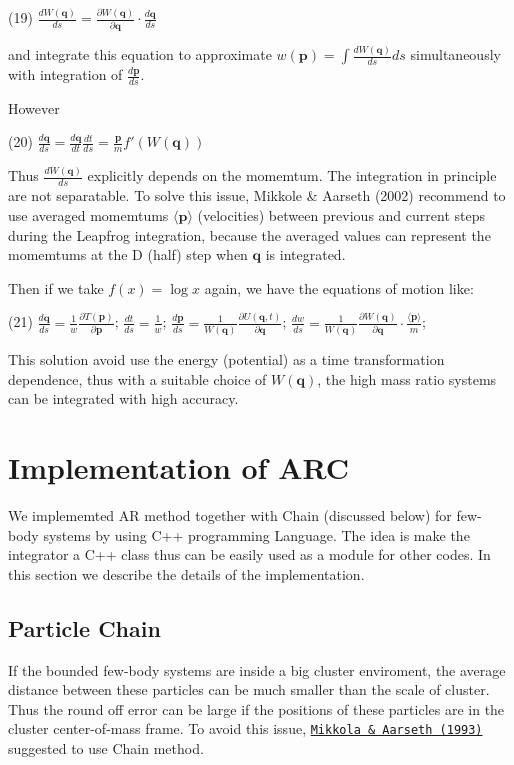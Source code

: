 (19) $ \frac{d W(\mathbf{q})}{d s} = \frac{\partial W(\mathbf{q})}{\partial \mathbf{q}} \cdot \frac{d \mathbf{q}} {d s} $

and integrate this equation to approximate $ w(\mathbf{p}) = \int \frac{d W(\mathbf{q})}{d s} d s$ simultaneously with integration of $ \frac{d \mathbf{p} }{d s} $.

However

(20) $ \frac{d \mathbf{q}}{d s} = \frac{d \mathbf{q}}{d t} \frac{d t}{d s} = \frac {\mathbf{p}}{m} f'(W(\mathbf{q}))$

Thus $ \frac{d W(\mathbf{q})}{d s} $ explicitly depends on the momemtum. The integration in principle are not separatable. To solve this issue, Mikkole \& Aarseth (2002) recommend to use averaged momemtums $ \langle \mathbf{p} \rangle $ (velocities) between previous and current step\textquotesingle{}s during the Leapfrog integration, because the averaged values can represent the momemtums at the D (half) step when $\mathbf{q}$ is integrated.

Then if we take $ f(x) = \log{x}$ again, we have the equations of motion like\+:

(21) $ \frac{d \mathbf{q} }{d s} = \frac{1}{w} \frac{\partial T(\mathbf{p})}{\partial {\mathbf{p}}} $; $ \frac{d t }{d s} = \frac{1}{w} $; $ \frac{d \mathbf{p} }{d s} = \frac{1}{W(\mathbf{q})} \frac{\partial U(\mathbf{q},t)}{\partial {\mathbf{q}}} $; $ \frac{d w}{d s} = \frac{1}{W(\mathbf{q})} \frac{\partial W(\mathbf{q})}{\partial \mathbf{q}} \cdot \frac{\langle \mathbf{p} \rangle} {m} $;

This solution avoid use the energy (potential) as a time transformation dependence, thus with a suitable choice of $ W(\mathbf{q}) $, the high mass ratio systems can be integrated with high accuracy.\hypertarget{index_code_sec}{}\section{Implementation of A\+RC}\label{index_code_sec}
We implememted AR method together with Chain (discussed below) for few-\/body systems by using C++ programming Language. The idea is make the integrator a C++ class thus can be easily used as a module for other codes. In this section we describe the details of the implementation.\hypertarget{index_chain_sec}{}\subsection{Particle Chain}\label{index_chain_sec}
If the bounded few-\/body systems are inside a big cluster enviroment, the average distance between these particles can be much smaller than the scale of cluster. Thus the round off error can be large if the positions of these particles are in the cluster center-\/of-\/mass frame. To avoid this issue, \href{http://adsabs.harvard.edu/abs/1993CeMDA..57..439M}{\tt Mikkola \& Aarseth (1993)} suggested to use Chain method.

